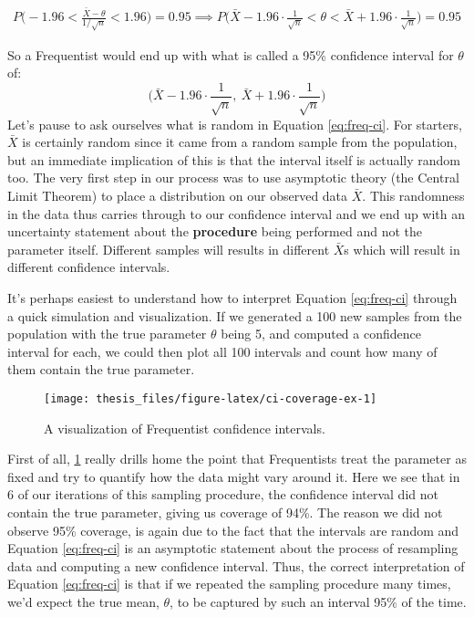 \documentclass[12pt,twoside]{reedthesis}
\begin{document}
\[
\begin{aligned}
P\bigg(-1.96 < \frac{\bar{X} - \theta}{1/\sqrt{n}} < 1.96\bigg) = 0.95 \implies P\bigg(\bar{X} - 1.96\cdot\frac{1}{\sqrt{n}} < \theta < \bar{X} + 1.96\cdot\frac{1}{\sqrt{n}}\bigg) = 0.95
\end{aligned}
\]

So a Frequentist would end up with what is called a 95\% confidence interval for \(\theta\) of:
\begin{equation}
  \bigg(\bar{X} - 1.96\cdot\frac{1}{\sqrt{n}}, \ \bar{X} + 1.96\cdot\frac{1}{\sqrt{n}}\bigg)
  \label{eq:freq-ci}
\end{equation}
Let's pause to ask ourselves what is random in Equation \eqref{eq:freq-ci}. For starters, \(\bar{X}\) is certainly random since it came from a random sample from the population, but an immediate implication of this is that the interval itself is actually random too. The very first step in our process was to use asymptotic theory (the Central Limit Theorem) to place a distribution on our observed data \(\bar{X}\). This randomness in the data thus carries through to our confidence interval and we end up with an uncertainty statement about the \textbf{procedure} being performed and not the parameter itself. Different samples will results in different \(\bar{X}\)s which will result in different confidence intervals.

It's perhaps easiest to understand how to interpret Equation \eqref{eq:freq-ci} through a quick simulation and visualization. If we generated a 100 new samples from the population with the true parameter \(\theta\) being 5, and computed a confidence interval for each, we could then plot all 100 intervals and count how many of them contain the true parameter.
\begin{figure}

{\centering \texttt{[image: thesis\_files/figure-latex/ci-coverage-ex-1]} 

}

\caption{A visualization of Frequentist confidence intervals.}\label{fig:ci-coverage-ex}
\end{figure}
First of all, \ref{fig:ci-coverage-ex} really drills home the point that Frequentists treat the parameter as fixed and try to quantify how the data might vary around it. Here we see that in 6 of our iterations of this sampling procedure, the confidence interval did not contain the true parameter, giving us coverage of 94\%. The reason we did not observe 95\% coverage, is again due to the fact that the intervals are random and Equation \eqref{eq:freq-ci} is an asymptotic statement about the process of resampling data and computing a new confidence interval. Thus, the correct interpretation of Equation \eqref{eq:freq-ci} is that if we repeated the sampling procedure many times, we'd expect the true mean, \(\theta\), to be captured by such an interval 95\% of the time.
\end{document}
